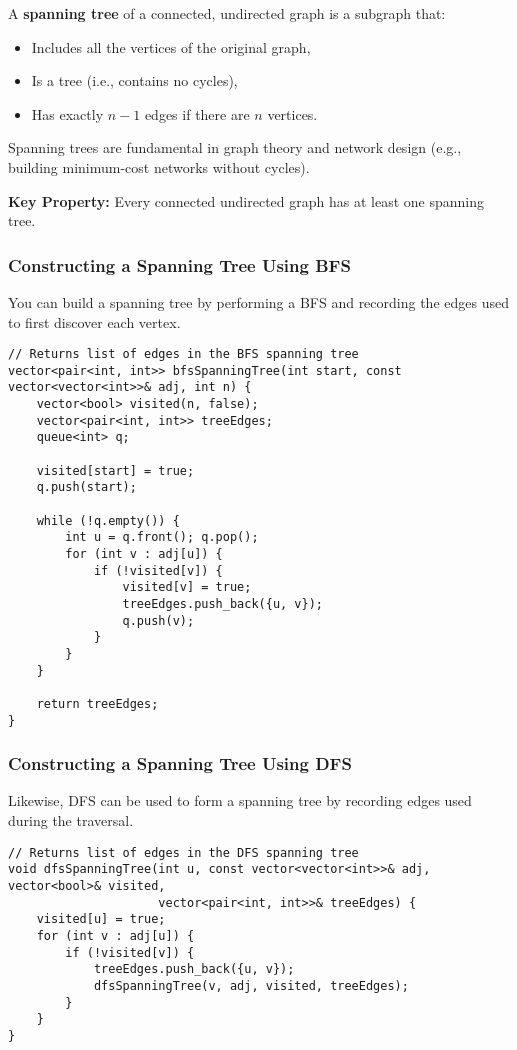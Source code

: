 \documentclass{article}
\begin{document}
A \textbf{spanning tree} of a connected, undirected graph is a subgraph that:
\begin{itemize}
    \item Includes all the vertices of the original graph,
    \item Is a tree (i.e., contains no cycles),
    \item Has exactly $n - 1$ edges if there are $n$ vertices.
\end{itemize}

Spanning trees are fundamental in graph theory and network design (e.g., building minimum-cost networks without cycles).

\textbf{Key Property:} Every connected undirected graph has at least one spanning tree.

\subsubsection*{Constructing a Spanning Tree Using BFS}

You can build a spanning tree by performing a BFS and recording the edges used to first discover each vertex.

\begin{lstlisting}[style=cppstyle]
// Returns list of edges in the BFS spanning tree
vector<pair<int, int>> bfsSpanningTree(int start, const vector<vector<int>>& adj, int n) {
    vector<bool> visited(n, false);
    vector<pair<int, int>> treeEdges;
    queue<int> q;

    visited[start] = true;
    q.push(start);

    while (!q.empty()) {
        int u = q.front(); q.pop();
        for (int v : adj[u]) {
            if (!visited[v]) {
                visited[v] = true;
                treeEdges.push_back({u, v});
                q.push(v);
            }
        }
    }

    return treeEdges;
}
\end{lstlisting}

\subsubsection*{Constructing a Spanning Tree Using DFS}

Likewise, DFS can be used to form a spanning tree by recording edges used during the traversal.

\begin{lstlisting}[style=cppstyle]
// Returns list of edges in the DFS spanning tree
void dfsSpanningTree(int u, const vector<vector<int>>& adj, vector<bool>& visited,
                     vector<pair<int, int>>& treeEdges) {
    visited[u] = true;
    for (int v : adj[u]) {
        if (!visited[v]) {
            treeEdges.push_back({u, v});
            dfsSpanningTree(v, adj, visited, treeEdges);
        }
    }
}
\end{lstlisting}
\end{document}
